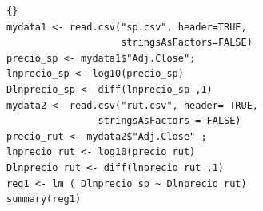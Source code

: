 \begin{lstlisting}[title={‘Código R para Regresiones’},basicstyle=\ttfamily]{}
mydata1 <- read.csv("sp.csv", header=TRUE, 
					stringsAsFactors=FALSE)
precio_sp <- mydata1$"Adj.Close"; 
lnprecio_sp <- log10(precio_sp)
Dlnprecio_sp <- diff(lnprecio_sp ,1)
mydata2 <- read.csv("rut.csv", header= TRUE,
				stringsAsFactors = FALSE)
precio_rut <- mydata2$"Adj.Close" ; 
lnprecio_rut <- log10(precio_rut)
Dlnprecio_rut <- diff(lnprecio_rut ,1)
reg1 <- lm ( Dlnprecio_sp ~ Dlnprecio_rut)
summary(reg1)
\end{lstlisting}\label{ejemplo3Regresiones}
%

